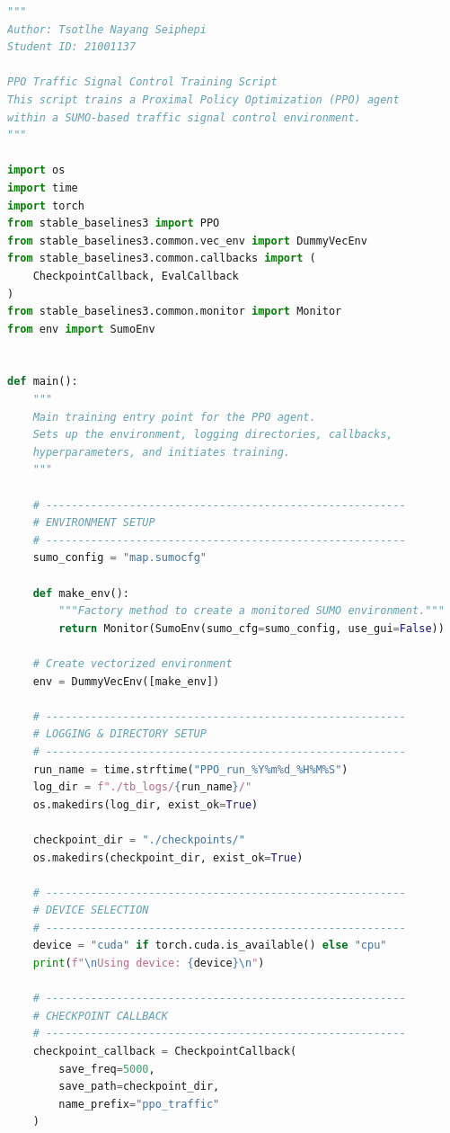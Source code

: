 \documentclass[11pt, a4paper]{report}
\begin{document}
\begin{lstlisting}[language=Python, caption={PPO Training Script --- Tsotlhe N. Seiphepi (ID: 21001137)}]
"""
Author: Tsotlhe Nayang Seiphepi
Student ID: 21001137

PPO Traffic Signal Control Training Script
This script trains a Proximal Policy Optimization (PPO) agent
within a SUMO-based traffic signal control environment.
"""

import os
import time
import torch
from stable_baselines3 import PPO
from stable_baselines3.common.vec_env import DummyVecEnv
from stable_baselines3.common.callbacks import (
    CheckpointCallback, EvalCallback
)
from stable_baselines3.common.monitor import Monitor
from env import SumoEnv


def main():
    """
    Main training entry point for the PPO agent.
    Sets up the environment, logging directories, callbacks,
    hyperparameters, and initiates training.
    """

    # --------------------------------------------------------
    # ENVIRONMENT SETUP
    # --------------------------------------------------------
    sumo_config = "map.sumocfg"

    def make_env():
        """Factory method to create a monitored SUMO environment."""
        return Monitor(SumoEnv(sumo_cfg=sumo_config, use_gui=False))

    # Create vectorized environment
    env = DummyVecEnv([make_env])

    # --------------------------------------------------------
    # LOGGING & DIRECTORY SETUP
    # --------------------------------------------------------
    run_name = time.strftime("PPO_run_%Y%m%d_%H%M%S")
    log_dir = f"./tb_logs/{run_name}/"
    os.makedirs(log_dir, exist_ok=True)

    checkpoint_dir = "./checkpoints/"
    os.makedirs(checkpoint_dir, exist_ok=True)

    # --------------------------------------------------------
    # DEVICE SELECTION
    # --------------------------------------------------------
    device = "cuda" if torch.cuda.is_available() else "cpu"
    print(f"\nUsing device: {device}\n")

    # --------------------------------------------------------
    # CHECKPOINT CALLBACK
    # --------------------------------------------------------
    checkpoint_callback = CheckpointCallback(
        save_freq=5000,
        save_path=checkpoint_dir,
        name_prefix="ppo_traffic"
    )


\end{lstlisting}
\end{document}
